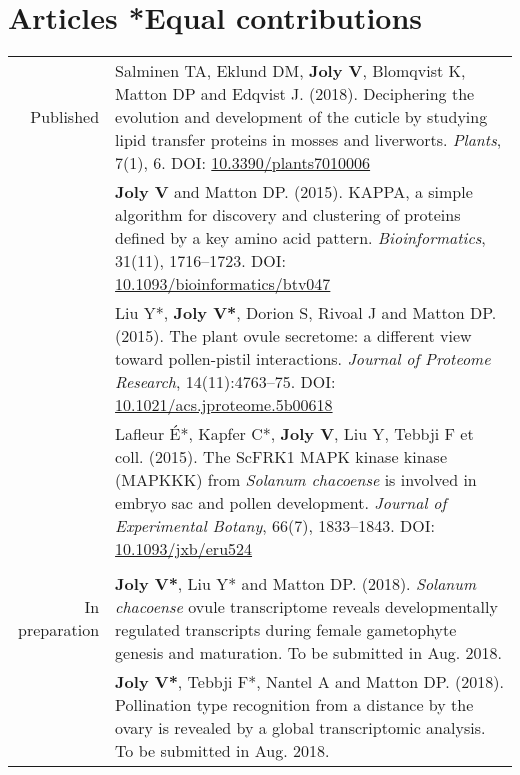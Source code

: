 \documentclass[letterpaper,10pt]{article}
\begin{document}
\section{Articles \hfill \small{*Equal contributions}}
\begin{tabular}{r|p{13.5cm}}

Published

& Salminen TA, Eklund DM, \textbf{Joly V}, Blomqvist K, Matton DP
  and Edqvist J. (2018).
  Deciphering the evolution and development of the cuticle by studying lipid
  transfer proteins in mosses and liverworts.
  \emph{Plants}, 7(1), 6.
  DOI: \href{http://doi.org/10.3390/plants7010006}{10.3390/plants7010006}
  \vspace{3mm} \\

& \textbf{Joly V} and Matton DP. (2015).
  KAPPA, a simple algorithm for discovery and clustering of proteins defined by
  a key amino acid pattern.
  \emph{Bioinformatics}, 31(11), 1716--1723.
  DOI: \href{http://doi.org/10.1093/bioinformatics/btv047}
  {10.1093/bioinformatics/btv047}
  \vspace{3mm} \\

& Liu Y*, \textbf{Joly V*}, Dorion S, Rivoal J and Matton DP. (2015).
  The plant ovule secretome: a different view toward pollen-pistil interactions.
  \emph{Journal of Proteome Research}, 14(11):4763--75.
  DOI: \href{http://doi.org/10.1021/acs.jproteome.5b00618}
  {10.1021/acs.jproteome.5b00618}
  \vspace{3mm} \\

& Lafleur É*, Kapfer C*, \textbf{Joly V}, Liu Y, Tebbji F et coll. (2015).
  The ScFRK1 MAPK kinase kinase (MAPKKK) from \emph{Solanum chacoense} is
  involved in embryo sac and pollen development.
  \emph{Journal of Experimental Botany}, 66(7), 1833--1843.
  DOI: \href{http://doi.org/10.1093/jxb/eru524}{10.1093/jxb/eru524}
  \\

\multicolumn{2}{c}{} \\

In preparation

& \textbf{Joly V*}, Liu Y* and Matton DP. (2018).
  \emph{Solanum chacoense} ovule transcriptome reveals developmentally regulated
  transcripts during female gametophyte genesis and maturation.
  To be submitted in Aug. 2018.
  \vspace{3mm} \\

& \textbf{Joly V*}, Tebbji F*, Nantel A and Matton DP. (2018).
  Pollination type recognition from a distance by the ovary is revealed by a
  global transcriptomic analysis.
  To be submitted in Aug. 2018.
  \\

\end{tabular}
\end{document}

